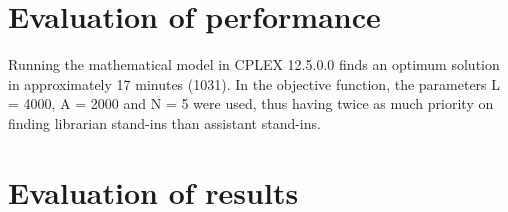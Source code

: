 
\section{Evaluation of performance}

Running the mathematical model in CPLEX 12.5.0.0 finds an optimum solution in approximately 17 minutes (1031). In the objective function, the parameters L = 4000, A = 2000 and N = 5 were used, thus having twice as much priority on finding librarian stand-ins than assistant stand-ins. 

\iffalse
Other parameters include:

\begin{itemize}
\item the number of allowed PL per week, which was one
\item the number of allowed PL in 10 weeks, which was three
\item the number of tasks which can be placed on the same shift time during a week, which was two
\end{itemize}
\fi



\section{Evaluation of results}


